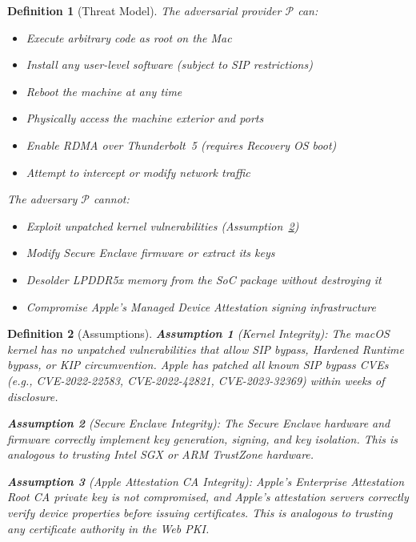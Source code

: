 \documentclass[10pt,twocolumn,letterpaper]{article}
\newtheorem{definition}{Definition}
\begin{document}
\begin{definition}[Threat Model]
\label{def:threat}
The adversarial provider $\mathcal{P}$ can:
\begin{itemize}[leftmargin=*,itemsep=1pt]
    \item Execute arbitrary code as root on the Mac
    \item Install any user-level software (subject to SIP restrictions)
    \item Reboot the machine at any time
    \item Physically access the machine exterior and ports
    \item Enable RDMA over Thunderbolt~5 (requires Recovery OS boot)
    \item Attempt to intercept or modify network traffic
\end{itemize}
The adversary $\mathcal{P}$ \emph{cannot}:
\begin{itemize}[leftmargin=*,itemsep=1pt]
    \item Exploit unpatched kernel vulnerabilities (Assumption~\ref{asm:kernel})
    \item Modify Secure Enclave firmware or extract its keys
    \item Desolder LPDDR5x memory from the SoC package without destroying it
    \item Compromise Apple's Managed Device Attestation signing infrastructure
\end{itemize}
\end{definition}

\begin{definition}[Assumptions]
\label{asm:kernel}
\textbf{Assumption 1} (Kernel Integrity): The macOS kernel has no unpatched vulnerabilities that allow SIP bypass, Hardened Runtime bypass, or KIP circumvention. Apple has patched all known SIP bypass CVEs (e.g., CVE-2022-22583, CVE-2022-42821, CVE-2023-32369) within weeks of disclosure.

\textbf{Assumption 2} (Secure Enclave Integrity): The Secure Enclave hardware and firmware correctly implement key generation, signing, and key isolation. This is analogous to trusting Intel SGX or ARM TrustZone hardware.

\textbf{Assumption 3} (Apple Attestation CA Integrity): Apple's Enterprise Attestation Root CA private key is not compromised, and Apple's attestation servers correctly verify device properties before issuing certificates. This is analogous to trusting any certificate authority in the Web PKI.
\end{definition}
\end{document}
